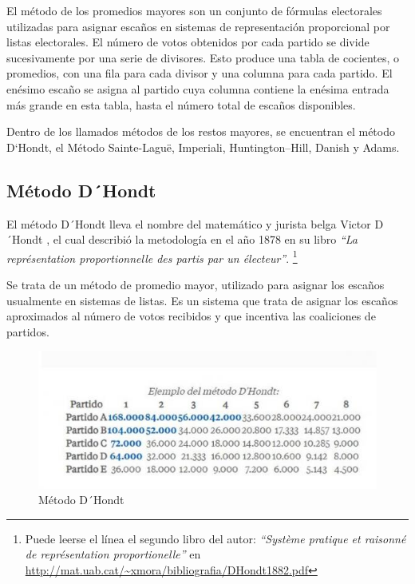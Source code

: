 \documentclass[12pt,a4paper,]{book}
\let\rmarkdownfootnote\footnote%
\def\footnote{\protect\rmarkdownfootnote}
\numberwithin{dummy}{section}
\theoremstyle{ocrenumbox}
\theoremstyle{blacknumex}
\theoremstyle{blacknumbox}
\theoremstyle{ocrenum}
\theoremstyle{ocrenum}
\begin{document}
El método de los promedios mayores son un conjunto de fórmulas
electorales utilizadas para asignar escaños en sistemas de
representación proporcional por listas electorales. El número de votos
obtenidos por cada partido se divide sucesivamente por una serie de
divisores. Esto produce una tabla de cocientes, o promedios, con una
fila para cada divisor y una columna para cada partido. El enésimo
escaño se asigna al partido cuya columna contiene la enésima entrada más
grande en esta tabla, hasta el número total de escaños disponibles.

Dentro de los llamados métodos de los restos mayores, se encuentran el
método D`Hondt, el Método Sainte-Laguë, Imperiali, Huntington--Hill,
Danish y Adams.

\hypertarget{muxe9todo-dhondt}{%
\subsection{Método D´Hondt}\label{muxe9todo-dhondt}}

El método D´Hondt lleva el nombre del matemático y jurista belga Victor
D´Hondt , el cual describió la metodología en el año 1878 en su libro
\emph{``La représentation proportionnelle des partis par un électeur''}.
\footnote{Puede leerse el línea el segundo libro del autor:
  \emph{``Système pratique et raisonné de représentation
  proportionelle''} en
  \url{http://mat.uab.cat/~xmora/bibliografia/DHondt1882.pdf}}

Se trata de un método de promedio mayor, utilizado para asignar los
escaños usualmente en sistemas de listas. Es un sistema que trata de
asignar los escaños aproximados al número de votos recibidos y que
incentiva las coaliciones de partidos.

\begin{figure}[H]

{\centering \includegraphics[width=1\linewidth]{graficos/vanguardia} 

}

\caption{Método D´Hondt}\label{fig:pressure}
\end{figure}
\end{document}
